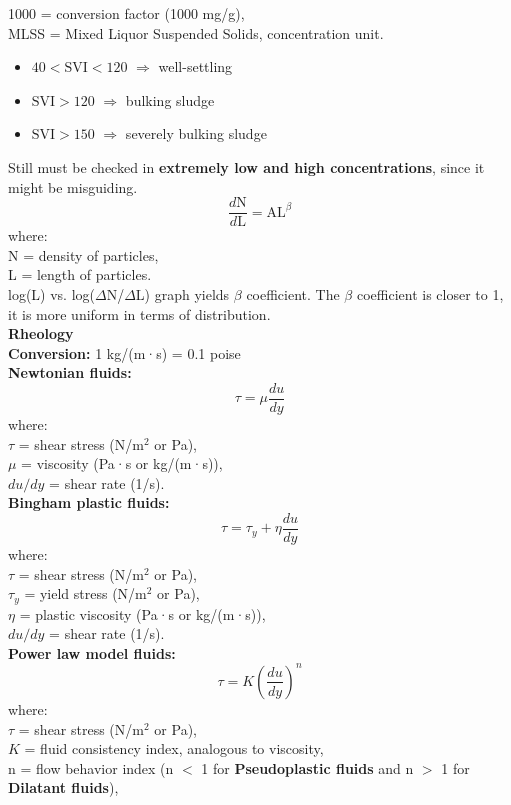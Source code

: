 \documentclass[a4paper, landscape, 8pt]{extarticle}
\begin{document}
\begin{multicols}{4}
1000 = conversion factor (1000 mg/g),\\
MLSS = Mixed Liquor Suspended Solids, concentration unit.
\begin{itemize}
    \item $40 < \text{SVI} < 120$ $\Rightarrow$ well-settling
    \item $\text{SVI} > 120$ $\Rightarrow$ bulking sludge
    \item $\text{SVI} > 150$ $\Rightarrow$ severely bulking sludge
\end{itemize}
Still must be checked in \textbf{extremely low and high concentrations}, since it might be misguiding.
\[
\frac{d\text{N}}{d\text{L}} = \text{AL}^\beta
\]
where:\\
N = density of particles,\\
L = length of particles.\\
log(L) vs. log($\Delta$N/$\Delta$L) graph yields $\beta$ coefficient. The $\beta$ coefficient is closer to 1, it is more uniform in terms of distribution.\\
\textbf{Rheology}\\
\textbf{Conversion:} 1 kg/(m·s) = 0.1 poise\\
\textbf{Newtonian fluids:}
\[
\tau = \mu \frac{du}{dy}
\]
where:\\
$\tau$ = shear stress (N/m$^2$ or Pa),\\
$\mu$ = viscosity (Pa·s or kg/(m·s)),\\
$du/dy$ = shear rate (1/s).\\
\textbf{Bingham plastic fluids:}
\[
\tau = \tau_y + \eta \frac{du}{dy}
\]
where:\\
$\tau$ = shear stress (N/m$^2$ or Pa),\\
$\tau_y$ = yield stress (N/m$^2$ or Pa),\\
$\eta$ = plastic viscosity (Pa·s or kg/(m·s)),\\
$du/dy$ = shear rate (1/s).\\
\textbf{Power law model fluids:}
\begin{equation}
    \tau = K \left(\frac{du}{dy}\right)^n
    \label{eq:powerlawmodel}
\end{equation}
where:\\
$\tau$ = shear stress (N/m$^2$ or Pa),\\
$K$ = fluid consistency index, analogous to viscosity,\\
n = flow behavior index (n $<$ 1 for \textbf{Pseudoplastic fluids} and n $>$ 1 for \textbf{Dilatant fluids}),\\

\end{multicols}
\end{document}
